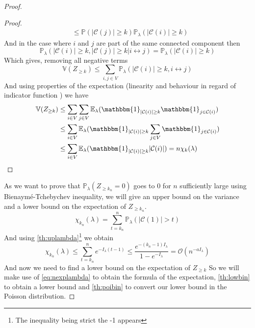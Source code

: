 \begin{proof}
\begin{proof}
\begin{align}
			&\leq \mathbb{P}( |\mathcal{C}(j)| \geq k ) \mathbb{P}_{\lambda}(|\mathcal{C}(i)| \geq k) 
		\end{align}
		And in the case where $i$ and $j$ are part of the same connected component then
		\begin{equation}\label{posval}
			\mathbb{P}_{\lambda}(|\mathcal{C}(i)| \geq k, |\mathcal{C}(j)| \geq k | i \leftrightarrow j)
			=\mathbb{P}_{\lambda}(|\mathcal{C}(i)| \geq k)
		\end{equation}
		Which gives, removing all negative terms
		\begin{equation}
			\mathbb{V}(Z_{\geq k}) \leq \sum_{i,j \in V} \mathbb{P}_{\lambda}(|\mathcal{C}(i)|\geq k, i \leftrightarrow j)
		\end{equation}
		And using properties of the expectation (linearity and behaviour in regard of indicator function ) we have
		\begin{align}
			\mathbb{V}(Z_{\geq k}) &\leq \sum_{i \in V}\sum_{j \in V} \mathbb{E}_{\lambda} ( \mathbbm{1}_{|\mathcal{C}(i)|\geq k} \mathbbm{1}_{j \in \mathcal{C}(i)})\\
				&\leq \sum_{i \in V} \mathbb{E}_{\lambda} ( \mathbbm{1}_{|\mathcal{C}(i)|\geq k} \sum_{j\in V} \mathbbm{1}_{j \in \mathcal{C}(i)}) \\
				&\leq \sum_{i \in V} \mathbb{E}_{\lambda} ( \mathbbm{1}_{|\mathcal{C}(i)|\geq k}  |\mathcal{C}(i)|) = n\chi_k(\lambda) 
		\end{align}
	\end{proof}
	As we want to prove that $\mathbb{P}_{\lambda}(Z_{\geq k_n} = 0)$ goes to 0 for $n$ sufficiently large using Bienaymé-Tchebychev inequality, we will give an upper bound on the variance and a lower bound on the expectation of $Z_{\geq k_n}$.
	\begin{equation}
		\chi_{k_n}(\lambda) = \sum_{t=k_n}^{n} \mathbb{P}_{\lambda}(|\mathcal{C}(1)| > t) 
	\end{equation}
	And using \ref{th:uplambda}\footnote{The inequality being strict the -1 appears}  we obtain
	\begin{equation}
		\chi_{k_n}(\lambda) \leq \sum_{t=k_n}^{n} e^{-I_{\lambda}(t-1)} \leq \frac{e^{-(k_n -1)I_{\lambda}}}{1-e^{-I_{\lambda}}} = \mathcal{O}(n^{-a I_{\lambda}})
	\end{equation}
	And now we need to find a lower bound on the expectation of $Z_{\geq k}$ So we will make use of \ref{eq:nexplambda} to obtain the formula of the expectation, 
	\ref{th:lowbin} to obtain a lower bound and \ref{th:poibin} to convert our lower bound in the Poisson distribution.

\end{proof}
